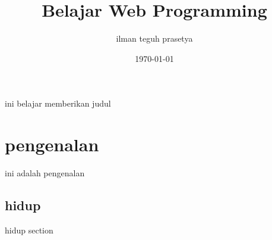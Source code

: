 \documentclass[12pt]{article}
\begin{document}
	\tableofcontents
	\title{Belajar Web Programming}
	\author{ilman teguh prasetya}
	\date{\today}
	\maketitle
	ini belajar memberikan judul
	\section{pengenalan}
	ini adalah pengenalan 
		\subsection{hidup}
		hidup section
\end{document}
